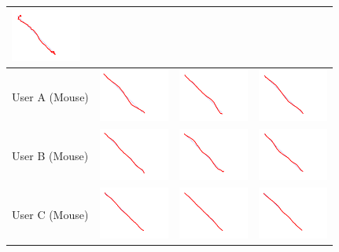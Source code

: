 \begin{tabular}{lccc}
\includegraphics[width=2.3cm]{../experiments/line_Angus_p_2.png} \\
\midrule
 User A (Mouse)&
\includegraphics[width=2.3cm]{../experiments/line_Ayaka_p_0_m.png} &
\includegraphics[width=2.3cm]{../experiments/line_Ayaka_p_1_m.png} &
\includegraphics[width=2.3cm]{../experiments/line_Ayaka_p_2_m.png} \\
\midrule
 User B (Mouse)&
\includegraphics[width=2.3cm]{../experiments/line_Takeyo_p_0_m.png} &
\includegraphics[width=2.3cm]{../experiments/line_Takeyo_p_1_m.png} &
\includegraphics[width=2.3cm]{../experiments/line_Takeyo_p_2_m.png} \\
\midrule
 User C (Mouse)&
\includegraphics[width=2.3cm]{../experiments/line_Angus_p_0_m.png} &
\includegraphics[width=2.3cm]{../experiments/line_Angus_p_1_m.png} &
\includegraphics[width=2.3cm]{../experiments/line_Angus_p_2_m.png} \\
\bottomrule
\end{tabular}

